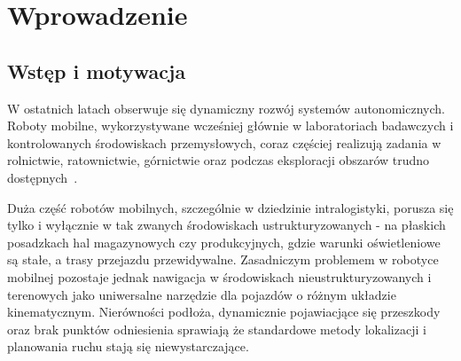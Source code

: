 \documentclass[a4paper,twoside,12pt]{book}
\newcounter{stronyPozaNumeracja}
\begin{document}
\tableofcontents

\setcounter{stronyPozaNumeracja}{\value{page}}
\mainmatter
\pagestyle{empty}

\cleardoublepage

\pagestyle{NumeryStronNazwyRozdzialow}


\chapter{Wprowadzenie}

\section{Wstęp i motywacja}
W ostatnich latach obserwuje się dynamiczny rozwój systemów autonomicznych. Roboty mobilne, wykorzystywane wcześniej głównie w laboratoriach badawczych i kontrolowanych środowiskach przemysłowych, coraz częściej realizują zadania w rolnictwie, ratownictwie, górnictwie oraz podczas eksploracji obszarów trudno dostępnych~\cite{trends_11299247}.


Duża część robotów mobilnych, szczególnie w dziedzinie intralogistyki, porusza się tylko i wyłącznie w tak zwanych środowiskach ustrukturyzowanych - na płaskich posadzkach hal magazynowych czy produkcyjnych, gdzie warunki oświetleniowe są stałe, a trasy przejazdu przewidywalne. Zasadniczym problemem w robotyce mobilnej pozostaje jednak nawigacja w środowiskach nieustrukturyzowanych i terenowych jako uniwersalne narzędzie dla pojazdów o różnym układzie kinematycznym. Nierówności podłoża, dynamicznie pojawiacjące się przeszkody oraz brak punktów odniesienia sprawiają że standardowe metody lokalizacji i planowania ruchu stają się niewystarczające.
\end{document}
